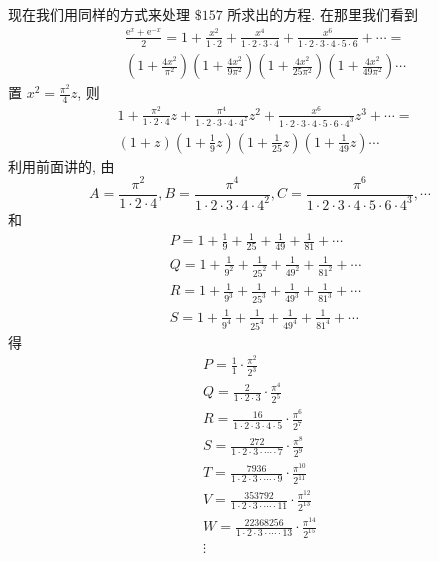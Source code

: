 现在我们用同样的方式来处理 $\$ 157$ 所求出的方程. 在那里我们看到
\[
\begin{aligned}
& \frac{\mathrm{e}^{x}+\mathrm{e}^{-x}}{2}=1+\frac{x^{2}}{1 \cdot 2}+\frac{x^{4}}{1 \cdot 2 \cdot 3 \cdot 4}+\frac{x^{6}}{1 \cdot 2 \cdot 3 \cdot 4 \cdot 5 \cdot 6}+\cdots= \\
& \left(1+\frac{4 x^{2}}{\pi^{2}}\right)\left(1+\frac{4 x^{2}}{9 \pi^{2}}\right)\left(1+\frac{4 x^{2}}{25 \pi^{2}}\right)\left(1+\frac{4 x^{2}}{49 \pi^{2}}\right) \cdots
\end{aligned}
\]
置 $x^{2}=\frac{\pi^{2}}{4} z$, 则
\[
\begin{aligned}
& 1+\frac{\pi^{2}}{1 \cdot 2 \cdot 4} z+\frac{\pi^{4}}{1 \cdot 2 \cdot 3 \cdot 4 \cdot 4^{z}} z^{2}+\frac{x^{6}}{1 \cdot 2 \cdot 3 \cdot 4 \cdot 5 \cdot 6 \cdot 4^{3}} z^{3}+\cdots= \\
& (1+z)\left(1+\frac{1}{9} z\right)\left(1+\frac{1}{25} z\right)\left(1+\frac{1}{49} z\right) \cdots
\end{aligned}
\]
利用前面讲的, 由
\[
A=\frac{\pi^{2}}{1 \cdot 2 \cdot 4}, B=\frac{\pi^{4}}{1 \cdot 2 \cdot 3 \cdot 4 \cdot 4^{2}}, C=\frac{\pi^{6}}{1 \cdot 2 \cdot 3 \cdot 4 \cdot 5 \cdot 6 \cdot 4^{3}}, \cdots
\]
和
\[
\begin{aligned}
& P=1+\frac{1}{9}+\frac{1}{25}+\frac{1}{49}+\frac{1}{81}+\cdots \\
& Q=1+\frac{1}{9^{2}}+\frac{1}{25^{2}}+\frac{1}{49^{2}}+\frac{1}{81^{2}}+\cdots \\
& R=1+\frac{1}{9^{3}}+\frac{1}{25^{3}}+\frac{1}{49^{3}}+\frac{1}{81^{3}}+\cdots \\
& S=1+\frac{1}{9^{4}}+\frac{1}{25^{4}}+\frac{1}{49^{4}}+\frac{1}{81^{4}}+\cdots
\end{aligned}
\]
得
\[
\begin{gathered}
P=\frac{1}{1} \cdot \frac{\pi^{2}}{2^{3}} \\
Q=\frac{2}{1 \cdot 2 \cdot 3} \cdot \frac{\pi^{4}}{2^{5}} \\
R=\frac{16}{1 \cdot 2 \cdot 3 \cdot 4 \cdot 5} \cdot \frac{\pi^{6}}{2^{7}} \\
S=\frac{272}{1 \cdot 2 \cdot 3 \cdot \cdots \cdot 7} \cdot \frac{\pi^{8}}{2^{9}} \\
T=\frac{7936}{1 \cdot 2 \cdot 3 \cdot \cdots \cdot 9} \cdot \frac{\pi^{10}}{2^{11}} \\
V=\frac{353792}{1 \cdot 2 \cdot 3 \cdot \cdots \cdot 11} \cdot \frac{\pi^{12}}{2^{13}} \\
W=\frac{22368256}{1 \cdot 2 \cdot 3 \cdot \cdots \cdot 13} \cdot \frac{\pi^{14}}{2^{15}} \\
\vdots 
\end{gathered}
\]
